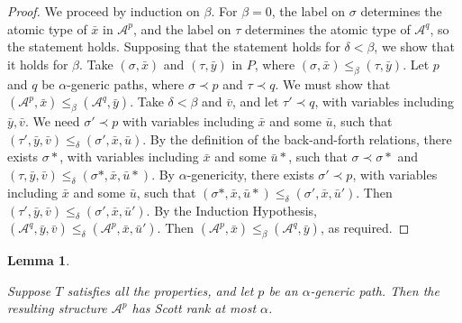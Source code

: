 \documentclass{article}
\newtheorem{lem}[thm]{Lemma}
\begin{document}
\begin{proof}

We proceed by induction on $\beta$.  For $\beta = 0$, the label on $\sigma$ determines the atomic type of $\bar{x}$ in $\mathcal{A}^p$, and the label on $\tau$ determines the atomic type of $\mathcal{A}^q$, so the statement holds.  
Supposing that the statement holds for $\delta < \beta$, we show that it holds for $\beta$.  Take $(\sigma,\bar{x})$ and $(\tau,\bar{y})$ in $P$, where $(\sigma,\bar{x})\leq_\beta(\tau,\bar{y})$.  Let $p$ and $q$ be $\alpha$-generic paths, where $\sigma\prec p$ and $\tau\prec q$.  We must show that $(\mathcal{A}^p,\bar{x})\leq_\beta(\mathcal{A}^q,\bar{y})$.  
Take $\delta < \beta$ and $\bar{v}$, and let $\tau'\prec q$, with variables including $\bar{y},\bar{v}$.  We need $\sigma'\prec p$ with variables including $\bar{x}$ and some $\bar{u}$, such that 
$(\tau',\bar{y},\bar{v})\leq_\delta (\sigma',\bar{x},\bar{u})$. By the definition of the back-and-forth relations, there exists $\sigma*$, with variables including 
$\bar{x}$ and some $\bar{u}*$, such that 
$\sigma\prec\sigma*$ and
$(\tau,\bar{y},\bar{v})\leq_\delta(\sigma*,\bar{x},\bar{u}*)$.  By $\alpha$-genericity, there exists $\sigma'\prec p$, with variables including $\bar{x}$ and some $\bar{u}$, such that $(\sigma*,\bar{x},\bar{u}*)\leq_\delta(\sigma',\bar{x},\bar{u}')$.  Then
$(\tau',\bar{y},\bar{v})\leq_\delta(\sigma',\bar{x},\bar{u}')$.  By the Induction Hypothesis, $(\mathcal{A}^q,\bar{y},\bar{v})\leq_\delta(\mathcal{A}^p,\bar{x},\bar{u}')$.  Then
$(\mathcal{A}^p,\bar{x})\leq_\beta(\mathcal{A}^q,\bar{y})$, as required.          
\end{proof}  

\begin{lem}
\label{lem24}

Suppose $T$ satisfies all the properties, and let $p$ be an $\alpha$-generic path.  Then the resulting structure $\mathcal{A}^p$ has Scott rank at most $\alpha$. 

\end{lem}
\end{document}
